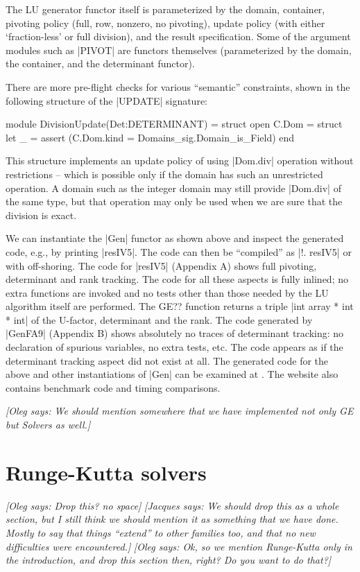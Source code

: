 \documentclass[draft]{elsart}
\newcommand{\oleg}[1]{{\it [Oleg says: #1]}}
\newcommand{\jacques}[1]{{\it [Jacques says: #1]}}
\begin{document}
The LU generator functor itself is 
parameterized by the domain, container, pivoting policy (full, row,
nonzero, no pivoting), update policy (with either `fraction-less'
or full division), and the result specification. Some of the
argument modules such as |PIVOT| are functors themselves (parameterized
by the domain, the container, and the determinant functor). 

There are more pre-flight checks for various ``semantic'' 
constraints, shown
in the following structure of the |UPDATE| signature:
\vspace*{-5pt}\begin{code}
module DivisionUpdate(Det:DETERMINANT) =
  struct
  open C.Dom = struct 
  let _ = assert (C.Dom.kind = Domains_sig.Domain_is_Field)
end
\end{code}
%
This structure implements an update policy of using
|Dom.div| operation without restrictions -- which is possible only if
the domain has such an unrestricted operation. A domain such as the integer
domain may still provide |Dom.div| of the same type, but that operation may
only be used when we are sure that the division is exact. 


We can instantiate the |Gen| functor as shown above and inspect the generated
code, e.g., by printing |resIV5|. The code can then be ``compiled'' as 
|!. resIV5| or with off-shoring. The code for |resIV5| (Appendix A) shows
full pivoting, determinant and rank tracking. The code for all these aspects is
fully inlined; no extra functions are invoked and no tests other than those
needed by the LU algorithm itself are performed. The GE?? function returns a
triple |int array * int * int| of the U-factor, determinant and the rank. The
code generated by |GenFA9| (Appendix B) shows absolutely no traces of
determinant tracking: no declaration of spurious variables, no extra tests,
etc. The code appears as if the determinant tracking aspect did not exist
at all. The generated code for the above and other instantiations of
|Gen| can be examined at \cite{metamonadsURL}. The website also 
contains benchmark code and timing comparisons.

\oleg{We should mention somewhere that we have implemented not only GE
  but Solvers as well.}

\section{Runge-Kutta solvers}
\label{s:ode}
\oleg{Drop this? no space}
\jacques{We should drop this as a whole section, but I still think we 
should mention it as something that we have done.  Mostly to say that
things ``extend'' to other families too, and that no new difficulties 
were encountered.}
\oleg{Ok, so we mention Runge-Kutta only in the introduction, and drop
  this section then, right? Do you want to do that?}
\end{document}
